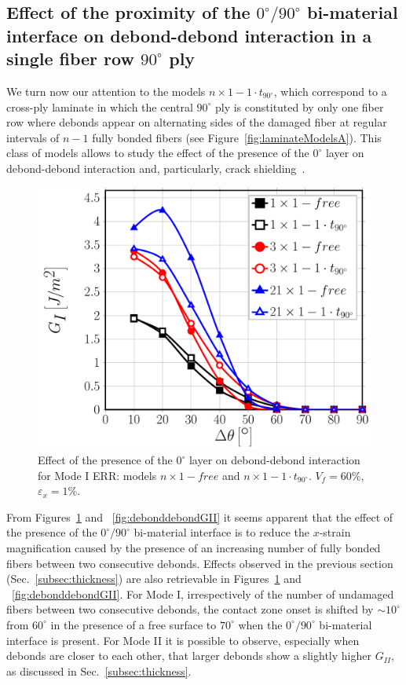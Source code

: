 \documentclass[review]{elsarticle}
\begin{document}
\subsection{Effect of the proximity of the $0^{\circ}/90^{\circ}$ bi-material interface on debond-debond interaction in a single fiber row $90^{\circ}$ ply}\label{subsec:debonddebondinter}

We turn now our attention to the models $n\times 1-1\cdot t_{90^{\circ}}$, which correspond to a cross-ply laminate in which the central $90^{\circ}$ ply is constituted by only one fiber row where debonds appear on alternating sides of the damaged fiber at regular intervals of $n-1$ fully bonded fibers (see Figure~\ref{fig:laminateModelsA}). This class of models allows to study the effect of the presence of the $0^{\circ}$ layer on debond-debond interaction and, particularly, crack shielding~\cite{Garcia2015,DiStasio2019}.

\begin{figure}[!h]
\centering
\includegraphics[width=\textwidth]{nx1-1-vf60-GI.pdf}
\caption{Effect of the presence of the $0^{\circ}$ layer on debond-debond interaction for Mode I ERR: models $n\times 1-free$ and $n\times 1-1\cdot t_{90^{\circ}}$. $V_{f}=60\%$, $\varepsilon_{x}=1\%$.}\label{fig:debonddebondGI}
\end{figure}

From Figures~\ref{fig:debonddebondGI} and ~\ref{fig:debonddebondGII} it seems apparent that the effect of the presence of the $0^{\circ}/90^{\circ}$ bi-material interface is to reduce the $x$-strain magnification caused by the presence of an increasing number of fully bonded fibers between two consecutive debonds. Effects observed in the previous section (Sec.~\ref{subsec:thickness}) are also retrievable in Figures~\ref{fig:debonddebondGI} and ~\ref{fig:debonddebondGII}. For Mode I, irrespectively of the number of undamaged fibers between two consecutive debonds, the contact zone onset is shifted by $\sim10^{\circ}$ from $60^{\circ}$ in the presence of a free surface to $70^{\circ}$ when the $0^{\circ}/90^{\circ}$ bi-material interface is present. For Mode II it is possible to observe, especially when debonds are closer to each other, that larger debonds show a slightly higher $G_{II}$, as discussed in Sec.~\ref{subsec:thickness}.
\end{document}
